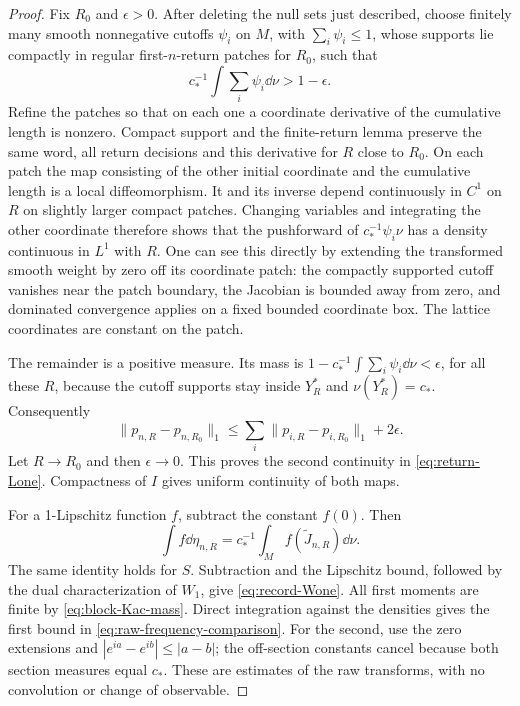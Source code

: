 \begin{proof}
Fix $R_0$ and $\epsilon>0$. After deleting the null sets just described,
choose finitely many smooth nonnegative cutoffs $\psi_i$ on $M$, with
$\sum_i\psi_i\le1$, whose supports lie compactly in regular
first-$n$-return patches for $R_0$, such that
\[
 c_*^{-1}\int\sum_i\psi_i\dd\nu>1-\epsilon.
\]
Refine the patches so that on each one a coordinate derivative of the
cumulative length is nonzero. Compact support and the finite-return
lemma preserve the same word, all return decisions and this derivative
for $R$ close to $R_0$. On each patch the map consisting of the other
initial coordinate and the cumulative length is a local diffeomorphism.
It and its inverse depend continuously in $C^1$ on $R$ on slightly
larger compact patches. Changing variables and integrating the other
coordinate therefore shows that the pushforward of
$c_*^{-1}\psi_i\nu$ has a density continuous in $L^1$ with $R$.
One can see this directly by extending the transformed smooth weight
by zero off its coordinate patch: the compactly supported cutoff
vanishes near the patch boundary, the Jacobian is bounded away from
zero, and dominated convergence applies on a fixed bounded coordinate
box. The lattice coordinates are constant on the patch.

The remainder is a positive measure. Its mass is
$1-c_*^{-1}\int\sum_i\psi_i\dd\nu<\epsilon$, for all these $R$,
because the cutoff supports stay inside $Y_R^*$ and $\nu(Y_R^*)=c_*$.
Consequently
\[
 \|p_{n,R}-p_{n,R_0}\|_1
 \le\sum_i\|p_{i,R}-p_{i,R_0}\|_1+2\epsilon.
\]
Let $R\to R_0$ and then $\epsilon\to0$. This proves the second
continuity in \eqref{eq:return-Lone}. Compactness of $I$ gives uniform
continuity of both maps.

For a 1-Lipschitz function $f$, subtract the constant $f(0)$. Then
\[
 \int f\dd\eta_{n,R}
 =c_*^{-1}\int_M f(\widetilde J_{n,R})\dd\nu.
\]
The same identity holds for $S$. Subtraction and the Lipschitz bound,
followed by the dual characterization of $W_1$, give
\eqref{eq:record-Wone}. All first moments are finite by
\eqref{eq:block-Kac-mass}. Direct integration against the densities
gives the first bound in \eqref{eq:raw-frequency-comparison}. For the
second, use the zero extensions and
$|e^{ia}-e^{ib}|\le|a-b|$; the off-section constants cancel because
both section measures equal $c_*$. These are estimates of the raw
transforms, with no convolution or change of observable.
\end{proof}

